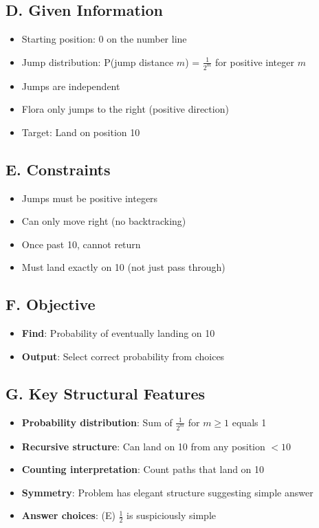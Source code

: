 \documentclass[11pt]{article}
\begin{document}
\begin{problembox}
\subsection*{D. Given Information}
\begin{itemize}[leftmargin=*]
    \item Starting position: 0 on the number line
    \item Jump distribution: P(jump distance $m$) = $\frac{1}{2^m}$ for positive integer $m$
    \item Jumps are independent
    \item Flora only jumps to the right (positive direction)
    \item Target: Land on position 10
\end{itemize}

\subsection*{E. Constraints}
\begin{itemize}[leftmargin=*]
    \item Jumps must be positive integers
    \item Can only move right (no backtracking)
    \item Once past 10, cannot return
    \item Must land exactly on 10 (not just pass through)
\end{itemize}

\subsection*{F. Objective}
\begin{itemize}[leftmargin=*]
    \item \textbf{Find}: Probability of eventually landing on 10
    \item \textbf{Output}: Select correct probability from choices
\end{itemize}

\subsection*{G. Key Structural Features}
\begin{itemize}[leftmargin=*]
    \item \textbf{Probability distribution}: Sum of $\frac{1}{2^m}$ for $m \geq 1$ equals 1
    \item \textbf{Recursive structure}: Can land on 10 from any position $< 10$
    \item \textbf{Counting interpretation}: Count paths that land on 10
    \item \textbf{Symmetry}: Problem has elegant structure suggesting simple answer
    \item \textbf{Answer choices}: (E) $\frac{1}{2}$ is suspiciously simple
\end{itemize}


\end{problembox}
\end{document}
